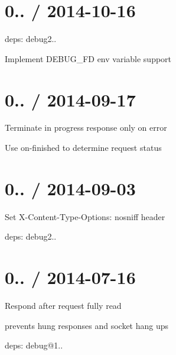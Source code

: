 \section*{0.. / 2014-\/10-\/16 }


\begin{DoxyItemize}
\item deps\+: debug2..
\begin{DoxyItemize}
\item Implement {\ttfamily D\+E\+B\+U\+G\+\_\+\+FD} env variable support
\end{DoxyItemize}
\end{DoxyItemize}

\section*{0.. / 2014-\/09-\/17 }


\begin{DoxyItemize}
\item Terminate in progress response only on error
\item Use {\ttfamily on-\/finished} to determine request status
\end{DoxyItemize}

\section*{0.. / 2014-\/09-\/03 }


\begin{DoxyItemize}
\item Set {\ttfamily X-\/\+Content-\/\+Type-\/\+Options\+: nosniff} header
\item deps\+: debug2..
\end{DoxyItemize}

\section*{0.. / 2014-\/07-\/16 }


\begin{DoxyItemize}
\item Respond after request fully read
\begin{DoxyItemize}
\item prevents hung responses and socket hang ups
\end{DoxyItemize}
\item deps\+: debug@1..
\end{DoxyItemize}

